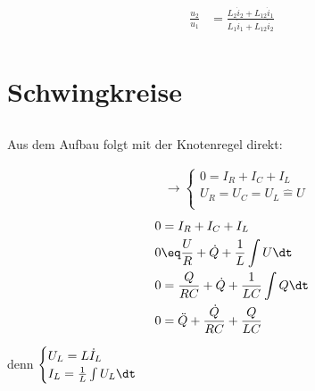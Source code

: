 \documentclass[11pt]{article}
\begin{document}
\subsection{}
\begin{align*}
    \frac{u_2}{u_1} &= \frac{L_2\dot i_2 + L_{12} \dot i_1}{L_1\dot i_1 + L_{12} \dot i_2}\\
\end{align*}

\section{Schwingkreise}
\subsection{}
\begin{adjustwidth}{20pt}{}
    Aus dem Aufbau folgt mit der Knotenregel direkt:
\end{adjustwidth}
\begin{align*}
    &\rightarrow \begin{cases}
        0 = I_R + I_C + I_L\\
        U_R=U_C=U_L \hat = U\\
    \end{cases}
\end{align*}
\begin{align*}
    0 &= I_R + I_C + I_L\\
    0 &\eq \frac{U}{R} + \dot Q + \frac 1L \int U\dt \\
    0 &= \frac{Q}{R C} + \dot Q  + \frac 1{LC} \int Q\dt \\
    0 &= \ddot Q + \frac{\dot Q}{R C} + \frac Q{LC} \\
\end{align*}
\begin{adjustwidth}{20pt}{}
    \con denn \(\begin{cases}
        U_L = L \dot I_L\\
        I_L = \frac 1L \int U_L\dt\\
    \end{cases}\)
\end{adjustwidth}
\end{document}
